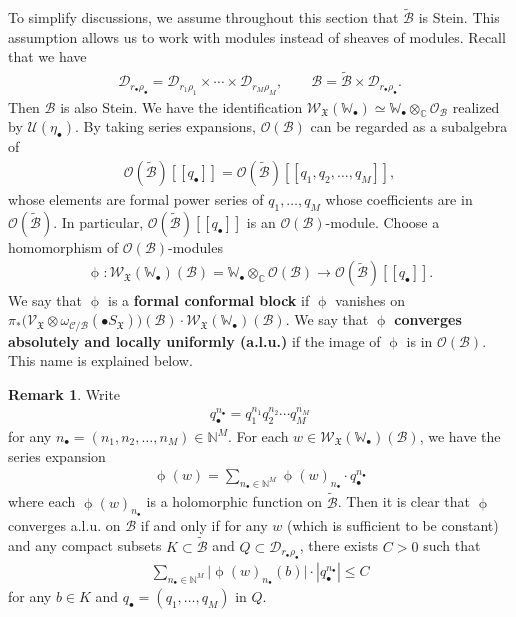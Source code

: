 \documentclass[12pt,a4paper,notitlepage]{report}
\theoremstyle{definition}
\newtheorem{rem}[df]{Remark}
\theoremstyle{plain}
\newcommand{\fk}{\mathfrak}
\newcommand{\mc}{\mathcal}
\newcommand{\wtd}{\widetilde}
\newcommand{\scr}{\mathscr}
\newcommand{\blt}{\bullet}
\newcommand{\Wbb}{\mathbb W}
\newcommand{\Cbb}{\mathbb C}
\newcommand{\Nbb}{\mathbb N}
\numberwithin{equation}{section}
\begin{document}
To simplify discussions, we assume throughout this section that $\wtd{\mc B}$ is Stein. This assumption allows us to work with modules instead of sheaves of modules. Recall that we have
\begin{align*}
\mc D_{r_\bullet\rho_\bullet}=\mc D_{r_1\rho_1}\times\cdots\times\mc D_{r_M\rho_M},\qquad\mc B=\wtd{\mc B}\times \mc D_{r_\bullet\rho_\bullet}.
\end{align*}
Then $\mc B$ is also Stein.  We have the identification $\scr W_{\fk X}(\Wbb_\blt)\simeq \Wbb_\blt\otimes_{\Cbb}\scr O_{\mc B}$ realized by $\mc U(\eta_\blt)$. By taking series expansions,  $\scr O(\mc B)$ can be regarded as a subalgebra of
\begin{align*}
\scr O(\wtd{\mc B})[[q_\blt]]=\scr O(\wtd{\mc B})[[q_1,q_2,\dots,q_M]],
\end{align*}
whose elements are formal power series of $q_1,\dots,q_M$ whose coefficients are in $\scr O(\wtd{\mc B})$. In particular, $\scr O(\wtd{\mc B})[[q_\blt]]$ is an $\scr O(\mc B)$-module. Choose a homomorphism of $\scr O(\mc B)$-modules
\begin{align}
\upphi:\scr W_{\fk X}(\Wbb_\blt)(\mc B)=\Wbb_\blt\otimes_\Cbb\scr O(\mc B)\rightarrow\scr O(\wtd{\mc B})[[q_\blt]].\label{eq102}
\end{align}
We say that $\upphi$ is a \textbf{formal conformal block} if $\upphi$ vanishes on $\pi_*\big(\scr V_{\fk X}\otimes\omega_{\mc C/\mc B}(\blt S_{\fk X})\big)(\mc B)\cdot \scr W_{\fk X}(\Wbb_\blt)(\mc B)$. We say that $\upphi$ \textbf{converges absolutely and locally uniformly (a.l.u.)} if the image of $\upphi$ is in $\scr O(\mc B)$. This name is explained below.

\begin{rem}\label{lb77}
Write
\begin{align*}
q_\blt^{n_\blt}=q_1^{n_1}q_2^{n_2}\cdots q_M^{n_M}
\end{align*}
for any $n_\blt=(n_1,n_2,\dots,n_M)\in\Nbb^M$. For each $w\in \scr W_{\fk X}(\Wbb_\blt)(\mc B)$, we have the series expansion
\begin{align*}
\upphi(w)=\sum_{n_\blt\in\Nbb^M}\upphi(w)_{n_\blt}\cdot q_\blt^{n_\blt}
\end{align*}
where each $\upphi(w)_{n_\blt}$ is a holomorphic function on $\wtd{\mc B}$. Then it is clear that  $\upphi$ converges a.l.u. on $\mc B$ if and only if for any $w$ (which is sufficient to be constant) and any  compact subsets $K\subset\wtd{\mc B}$ and $Q\subset\mc D_{r_\blt\rho_\blt}$,  there exists $C>0$ such that
\begin{align}
\sum_{n_\blt\in\Nbb^M}\big|\upphi(w)_{n_\blt}(b)\big|\cdot |q_\blt^{n_\blt}|\leq C
\end{align}
for any $b\in K$ and $q_\blt=(q_1,\dots,q_M)$ in $Q$. 
\end{rem}
\end{document}
